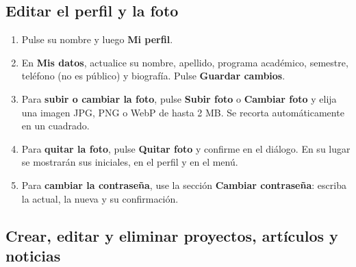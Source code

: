 \documentclass[11pt,a4paper]{article}
\newcommand{\boton}[1]{\textbf{\textcolor{siiisazul}{#1}}}
\begin{document}

\subsection{Editar el perfil y la foto}
\begin{enumerate}
  \item Pulse su nombre y luego \boton{Mi perfil}.
  \item En \boton{Mis datos}, actualice su nombre, apellido, programa acad\'emico, semestre, tel\'efono (no es p\'ublico)
    y biograf\'ia. Pulse \boton{Guardar cambios}.
  \item Para \textbf{subir o cambiar la foto}, pulse \boton{Subir foto} o \boton{Cambiar foto} y elija una imagen JPG,
    PNG o WebP de hasta 2 MB. Se recorta autom\'aticamente en un cuadrado.
  \item Para \textbf{quitar la foto}, pulse \boton{Quitar foto} y confirme en el di\'alogo. En su lugar se mostrar\'an
    sus iniciales, en el perfil y en el men\'u.
  \item Para \textbf{cambiar la contrase\~na}, use la secci\'on \boton{Cambiar contrase\~na}: escriba la actual, la
    nueva y su confirmaci\'on.
\end{enumerate}


\subsection{Crear, editar y eliminar proyectos, art\'iculos y noticias}
\end{document}
